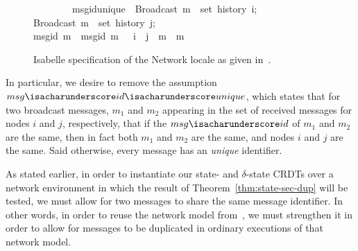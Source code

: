 \begin{figure}[H]
\begin{isabelle}
~~~~~~~~\>msg{\isacharunderscore}id{\isacharunderscore}unique{\isacharcolon}\ \>{\isasymlbrakk}\ \>{\isachardoublequoteopen}Broadcast\ m{}\ {\isasymin}\ set\ {\isacharparenleft}history\ i{\isacharparenright};\\
\>\>\>Broadcast\ m{}\ {\isasymin}\ set\ {\isacharparenleft}history\ j{\isacharparenright};\\
\>\>\>msg{\isacharunderscore}id\ m{}\ {\isacharequal}\ msg{\isacharunderscore}id\ m{}\ \>{\isasymrbrakk}\ {\isasymLongrightarrow}\ i\ {\isacharequal}\ j\ {\isasymand}\ m{}\ {\isacharequal}\ m{}{\isachardoublequoteclose}
\end{isabelle}
\centering
\caption{Isabelle specification of the Network locale as given
  in~\citep{gomes17}.}
\end{figure}

In particular, we desire to remove the assumption
$msg{\isacharunderscore}id{\isacharunderscore}unique$, which states that for two
broadcast messages, $m_1$ and $m_2$ appearing in the set of received messages
for nodes $i$ and $j$, respectively, that if the $msg{\isacharunderscore}id$ of
$m_1$ and $m_2$ are the same, then in fact both $m_1$ and $m_2$ are the same,
and nodes $i$ and $j$ are the same. Said otherwise, every message has an
\emph{unique} identifier.

As stated earlier, in order to instantiate our state- and $\delta$-state CRDTs
over a network environment in which the result of
Theorem~\ref{thm:state-sec-dup} will be tested, we must allow for two messages
to share the same message identifier. In other words, in order to reuse the
network model from~\citep{gomes17}, we must strengthen it in order to allow for
messages to be duplicated in ordinary executions of that network model.

